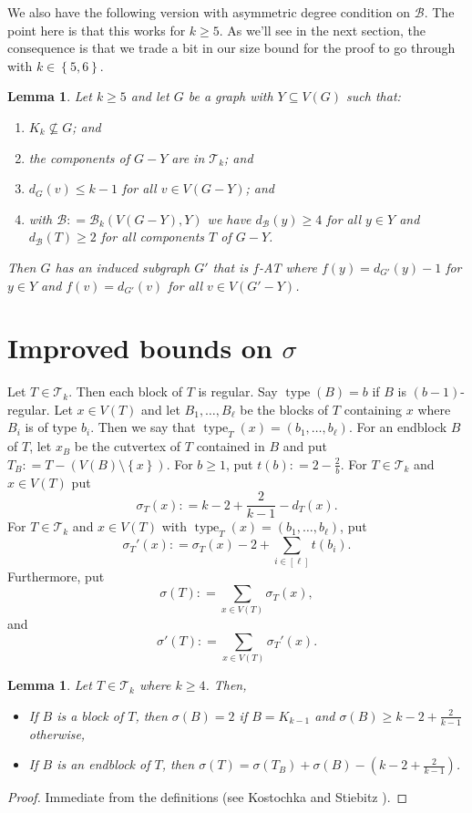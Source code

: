 \documentclass[12pt]{article}
\theoremstyle{plain}
\newtheorem{lem}[thm]{Lemma}
\theoremstyle{definition}
\theoremstyle{remark}
\newcommand{\fancy}[1]{\mathcal{#1}}
\newcommand{\T}{\fancy{T}}
\newcommand{\B}{\fancy{B}}
\newcommand{\set}[1]{\left\{ #1 \right\}}
\newcommand{\irange}[1]{\left[#1\right]}
\newcommand{\parens}[1]{\left( #1 \right)}
\newcommand{\DefinedAs}{\mathrel{\mathop:}=}
\newcommand{\type}{\operatorname{type}}
\begin{document}
We also have the following version with asymmetric degree condition on $\B$.  The point here is that this works for $k \ge 5$.  As we'll see in the next section, the consequence is that we trade a bit in our size bound for the proof to go through with $k \in \set{5,6}$.

\begin{lem}
	\label{MultipleHighConfigurationEulerLopsided} Let $k \ge 5$ and let $G$ be a graph with
	$Y\subseteq V(G)$ such that: 
	\begin{enumerate}
		\item $K_{k}\not\subseteq G$; and 
		\item the components of $G-Y$ are in $\T_{k}$; and 
		\item $d_{G}(v)\leq k-1$ for all $v\in V(G-Y)$; and 
		\item with $\B \DefinedAs \B_k(V(G-Y), Y)$ we have $d_{\B}(y) \ge 4$ for all $y \in Y$ and $d_{\B}(T) \ge 2$ for all components $T$ of $G-Y$.
	\end{enumerate}
	\noindent Then $G$ has an induced subgraph $G'$ that is $f$-AT where $f(y)=d_{G'}(y)-1$
	for $y\in Y$ and $f(v)=d_{G'}(v)$ for all $v\in V(G'-Y)$.\end{lem}

\section{Improved bounds on $\sigma$}
Let $T \in \T_k$.  Then each block of $T$ is regular. Say $\type(B) = b$ if $B$ is $(b-1)$-regular.  Let $x \in V(T)$ and let $B_1, \ldots, B_{\ell}$ be the blocks of $T$ containing $x$ where $B_i$ is of type $b_i$.  Then we say that $\type_T(x) = (b_1,\ldots,b_{\ell})$.  For an endblock $B$ of $T$, let $x_B$ be the cutvertex of $T$ contained in $B$ and put $T_B \DefinedAs T - \parens{V(B) \setminus \set{x}}$.  For $b \ge 1$, put $t(b) \DefinedAs 2 - \frac{2}{b}$.   For $T \in \T_k$ and $x \in V(T)$ put
\[\sigma_T(x) \DefinedAs k - 2 + \frac{2}{k-1} - d_T(x).\]
For $T \in \T_k$ and $x \in V(T)$ with $\type_T(x) = (b_1,\ldots, b_{\ell})$, put
\[\sigma_T'(x) \DefinedAs \sigma_T(x) - 2 + \sum_{i \in \irange{\ell}}t(b_i).\]
Furthermore, put
\[\sigma(T) \DefinedAs \sum_{x \in V(T)} \sigma_T(x),\]
and
\[\sigma'(T) \DefinedAs \sum_{x \in V(T)} \sigma_T'(x).\]

\begin{lem}\label{EndBlockBusiness}
	Let $T \in \T_k$ where $k \ge 4$.  Then,
	\begin{itemize}
		\item[(a)] If $B$ is a block of $T$, then $\sigma(B) = 2$ if $B = K_{k-1}$ and $\sigma(B) \ge k - 2 + \frac{2}{k-1}$ otherwise,
		\item[(b)] If $B$ is an endblock of $T$, then $\sigma(T) = \sigma(T_B) + \sigma(B) - \parens{ k - 2 + \frac{2}{k-1}}$.
	\end{itemize}
\end{lem}
\begin{proof}
	Immediate from the definitions (see Kostochka and Stiebitz \cite{kostochkastiebitzedgesincriticalgraph}).
\end{proof}
\end{document}
